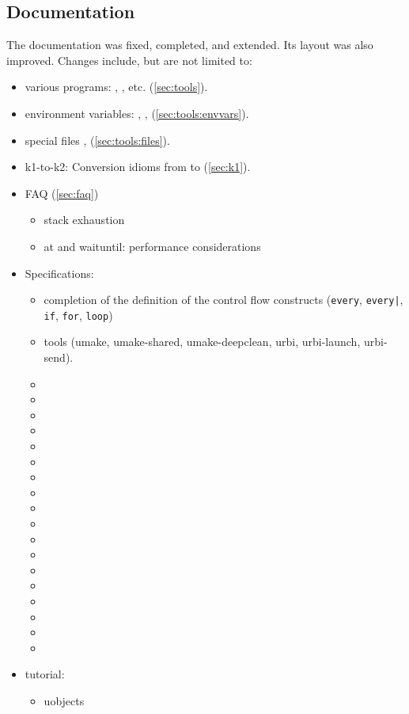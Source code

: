 \subsection{Documentation}

The documentation was fixed, completed, and extended.  Its layout was
also improved.  Changes include, but are not limited to:

\begin{itemize}
\item various programs: , ,
   etc. (\autoref{sec:tools}).
\item environment variables: , ,
   (\autoref{sec:tools:envvars}).
\item special files , 
  (\autoref{sec:tools:files}).
\item k1-to-k2: Conversion idioms from  to  (\autoref{sec:k1}).
\item FAQ (\autoref{sec:faq})
  \begin{itemize}
  \item stack exhaustion
  \item at and waituntil: performance considerations
  \end{itemize}
\item Specifications:
  \begin{itemize}
  \item completion of the definition of the control flow constructs
    (\lstinline|every|, \lstinline{every|}, \lstinline|if|,
    \lstinline|for|, \lstinline|loop|)
  \item tools (umake, umake-shared, umake-deepclean, urbi,
    urbi-launch, urbi-send).
  \item {}
  \item {}
  \item {}
  \item {}
  \item {}
  \item {}
  \item {}
  \item {}
  \item {}
  \item {}
  \item {}
  \item {}
  \item {}
  \item {}
  \item {}
  \item {}
  \item {}
  \item {}
  \end{itemize}
\item tutorial:
  \begin{itemize}
  \item uobjects
  \end{itemize}
\end{itemize}

